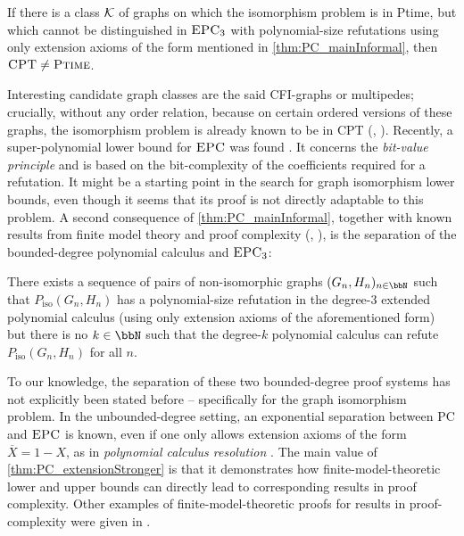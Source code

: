 \documentclass[a4paper,UKenglish,cleveref, autoref, thm-restate]{lipics-v2021}
\newcommand{\CPT}{\mbox{\sc CPT}}
\newcommand{\EPC}{\mbox{\sc EPC}}
\newcommand{\PC}{\textrm {PC}}
\newcommand{\ptime}{\mbox{\sc Ptime}}
\newcommand{\Kk}{{\cal K}}
\renewcommand{\bar}{\overline}
\newcommand{\Piso}{P_{\text{iso}}}
\begin{document}
	\begin{theorem}
		\label{thm:PC_mainLowerBound}
		If there is a class $\Kk$ of graphs on which the isomorphism problem is in \ptime, but which cannot be distinguished in $\EPC_3$ with polynomial-size refutations using only extension axioms of the form mentioned in \autoref{thm:PC_mainInformal}, then $\CPT \neq \ptime$.
	\end{theorem} 
	Interesting candidate graph classes are the said CFI-graphs or multipedes; crucially, without any order relation, because on certain ordered versions of these graphs, the isomorphism problem is already known to be in CPT (\cite{dawar2008}, \cite{multipedeIsomorphism}). Recently, a super-polynomial lower bound for $\EPC$ was found \cite{alekseev}. It concerns the \emph{bit-value principle} and is based on the bit-complexity of the coefficients required for a refutation. It might be a starting point in the search for graph isomorphism lower bounds, even though it seems that its proof is not directly adaptable to this problem. A second consequence of \autoref{thm:PC_mainInformal}, together with known results from finite model theory and proof complexity (\cite{dawar2008}, \cite{berkholz}), is the separation of the bounded-degree polynomial calculus and $\EPC_3$:
	\begin{theorem}
		\label{thm:PC_extensionStronger}
		There exists a sequence of pairs of non-isomorphic graphs $(G_n,H_n)_{n \in \bbN}$ such that $\Piso(G_n,H_n)$ has a polynomial-size refutation in the degree-$3$ extended polynomial calculus (using only extension axioms of the aforementioned form) but there is no $k \in \bbN$ such that the degree-$k$ polynomial calculus can refute $\Piso(G_n,H_n)$ for all $n$.
	\end{theorem}
	To our knowledge, the separation of these two bounded-degree proof systems has not explicitly been stated before -- specifically for the graph isomorphism problem. In the unbounded-degree setting, an exponential separation between $\PC$ and $\EPC$ is known, even if one only allows extension axioms of the form $\bar{X} = 1 - X$, as in \emph{polynomial calculus resolution} \cite{massimoPCR}.
	The main value of \autoref{thm:PC_extensionStronger} is that it demonstrates how finite-model-theoretic lower and upper bounds can directly lead to corresponding results in proof complexity. Other examples of finite-model-theoretic proofs for results in proof-complexity were given in \cite{ggpp}.
	
	
\end{document}
